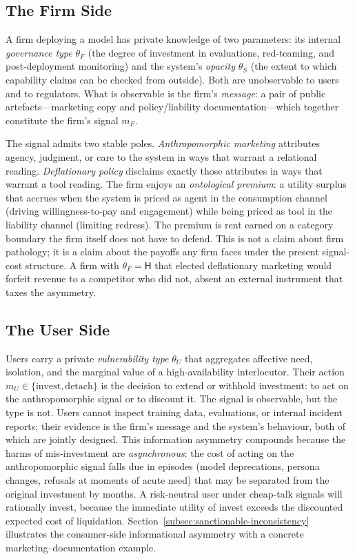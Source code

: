 \documentclass[review,authoryear]{elsarticle}
\theoremstyle{definition}
\theoremstyle{plain}
\begin{document}
\subsection{The Firm Side}
\label{subsec:firm-side}

A firm deploying a model has private knowledge of two parameters: its internal \emph{governance type} $\theta_F$ (the degree of investment in evaluations, red-teaming, and post-deployment monitoring) and the system's \emph{opacity} $\theta_S$ (the extent to which capability claims can be checked from outside). Both are unobservable to users and to regulators. What is observable is the firm's \emph{message}: a pair of public artefacts---marketing copy and policy/liability documentation---which together constitute the firm's signal $m_F$.

The signal admits two stable poles. \emph{Anthropomorphic marketing} attributes agency, judgment, or care to the system in ways that warrant a relational reading. \emph{Deflationary policy} disclaims exactly those attributes in ways that warrant a tool reading. The firm enjoys an \emph{ontological premium}: a utility surplus that accrues when the system is priced as agent in the consumption channel (driving willingness-to-pay and engagement) while being priced as tool in the liability channel (limiting redress). The premium is rent earned on a category boundary the firm itself does not have to defend. This is not a claim about firm pathology; it is a claim about the payoffs any firm faces under the present signal-cost structure. A firm with $\theta_F = \mathsf{H}$ that elected deflationary marketing would forfeit revenue to a competitor who did not, absent an external instrument that taxes the asymmetry.

\subsection{The User Side}
\label{subsec:user-side}

Users carry a private \emph{vulnerability type} $\theta_U$ that aggregates affective need, isolation, and the marginal value of a high-availability interlocutor. Their action $m_U \in \{\text{invest}, \text{detach}\}$ is the decision to extend or withhold investment: to act on the anthropomorphic signal or to discount it. The signal is observable, but the type is not. Users cannot inspect training data, evaluations, or internal incident reports; their evidence is the firm's message and the system's behaviour, both of which are jointly designed. This information asymmetry compounds because the harms of mis-investment are \emph{asynchronous}: the cost of acting on the anthropomorphic signal falls due in episodes (model deprecations, persona changes, refusals at moments of acute need) that may be separated from the original investment by months. A risk-neutral user under cheap-talk signals will rationally invest, because the immediate utility of invest exceeds the discounted expected cost of liquidation. Section~\ref{subsec:sanctionable-inconsistency} illustrates the consumer-side informational asymmetry with a concrete marketing--documentation example.
\end{document}

